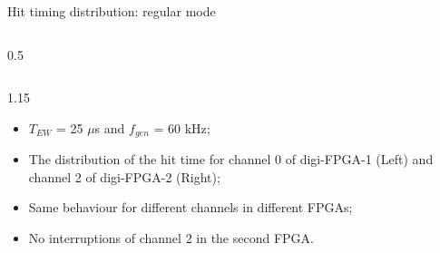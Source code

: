 \documentclass{beamer}
\begin{document}
\begin{frame}{Hit timing distribution: regular mode}
\begin{columns}
\begin{column}{0.5\framewidth}
\begin{figure}[H]
          \label{fig:enter-label} 
          \end{figure} 
   \end{column}
\end{columns}
 \begin{columns}
    \begin{column}{1.15\framewidth}
     \begin{itemize}
        \item $T_{EW}$ = 25 $\mu$s and $f_{gen}$ = 60 kHz;
      \item The distribution of the hit time for channel 0 of digi-FPGA-1 (Left) and channel 2 of digi-FPGA-2 (Right);
        \item Same behaviour for different channels in different FPGAs;
        \item No interruptions of channel 2 in the second FPGA.    \end{itemize}
             \end{column}
\end{columns}     
         
\end{frame}
\end{document}
